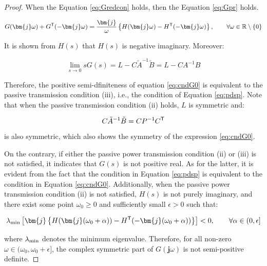 \documentclass[graybox, envcountchap]{svmult}
\begin{document}
\begin{proof}
When the Equation \ref{eq:Gredcon} holds, then the Equation \ref{eq:Gpr} holds.

\begin{equation}\label{eq:NIineq}
  G(\bm{j}\omega) + G^{\sf T}(-\bm{j}\omega)
  =
  \frac{\bm{j}}{\omega} \left\{
  H(\bm{j}\omega) - H^{\sf T}(-\bm{j}\omega)
  \right\}
  ,\qquad \forall \omega \in \mathbb{R}\setminus\{0\}
\end{equation}

It is shown from $H(s)$ that $H(s)$ is negative imaginary. Moreover: 

\begin{equation*}
  \lim_{s\rightarrow 0} s G(s) =
  L - C\tilde{A}^{-1}\tilde{B} = L - C A^{-1} B
\end{equation*}

Therefore, the positive semi-dfiniteness of equation \ref{eq:cndG0} is
equivalent to the passive transmission condition (iii), i.e., the condition of
Equation \ref{eq:pdsp}. Note that when the passive transmission condition (ii)
holds, $L$ is symmetric and:

\begin{equation*}
  C\tilde{A}^{-1}\tilde{B} = C P^{-1} C^{\sf T}
\end{equation*}
is also symmetric, which also shows the symmetry of the expression
\ref{eq:cndG0}.

On the contrary, if either the passive power transmission condition (ii) or
(iii) is not satisfied, it indicates that $G(s)$ is not positive real. As for
the latter, it is evident from the fact that the condition in Equation
\ref{eq:pdsp} is equivalent to the condition in Equation \ref{eq:cndG0}.
Additionally, when the passive power transmission condition (ii) is not
satisfied, $H(s)$ is not purely imaginary, and there exist some point
$\omega_0\geq 0$ and sufficiently small $\epsilon >0$ such that:

\begin{equation*}
  \lambda_{\rm min}\left[
  \bm{j}
  \left\{
  H(\bm{j}(\omega_0 + \alpha )) - H^{\sf T}(-\bm{j}(\omega_0 + \alpha ))
  \right\}
  \right] < 0
  ,\qquad
  \forall \alpha \in (0,\epsilon] 
\end{equation*}

where $\lambda_{\rm min}$ denotes the minimum eigenvalue. Therefore, for all
non-zero $\omega \in (\omega_0, \omega_0+\epsilon]$, the complex symmetric part
of $G(\bm{j} \omega)$ is not semi-positive definite.
\end{proof}
\end{document}
